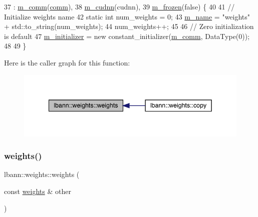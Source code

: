 \begin{DoxyCode}
37   : \hyperlink{classlbann_1_1weights_a223e8907034888392548ae901222b39c}{m\_comm}(\hyperlink{file__io_8cpp_ab048c6f9fcbcfaa57ce68b00263dbebe}{comm}),
38     \hyperlink{classlbann_1_1weights_a873e8c14998915e442d03b8dd7d2fdf7}{m\_cudnn}(cudnn),
39     \hyperlink{classlbann_1_1weights_a3962305112ba98ef2eb89c6f7035f6dd}{m\_frozen}(\textcolor{keyword}{false}) \{
40 
41   \textcolor{comment}{// Initialize weights name}
42   \textcolor{keyword}{static} \textcolor{keywordtype}{int} num\_weights = 0;
43   \hyperlink{classlbann_1_1weights_a08abf0bb29aa47be21bfc7473b4b9b99}{m\_name} = \textcolor{stringliteral}{"weights"} + std::to\_string(num\_weights);
44   num\_weights++;
45 
46   \textcolor{comment}{// Zero initialization is default}
47   \hyperlink{classlbann_1_1weights_a3ddbcce8d543e975efeebdb43e82444c}{m\_initializer} = \textcolor{keyword}{new} constant\_initializer(\hyperlink{classlbann_1_1weights_a223e8907034888392548ae901222b39c}{m\_comm}, DataType(0));
48 
49 \}
\end{DoxyCode}
Here is the caller graph for this function\+:\nopagebreak
\begin{figure}[H]
\begin{center}
\leavevmode
\includegraphics[width=342pt]{classlbann_1_1weights_a21a3a3f1806197d10619a1450871e066_icgraph}
\end{center}
\end{figure}
\mbox{\label{classlbann_1_1weights_ab7cca67d4459f3ba6a72dae4bb8d5cc6}} 
\subsubsection{\texorpdfstring{weights()}{weights()}\hspace{0.1cm}{\footnotesize\ttfamily [2/2]}}
{\footnotesize\ttfamily lbann\+::weights\+::weights (\begin{DoxyParamCaption}\item[{const \hyperlink{classlbann_1_1weights}{weights} \&}]{other }\end{DoxyParamCaption})}



